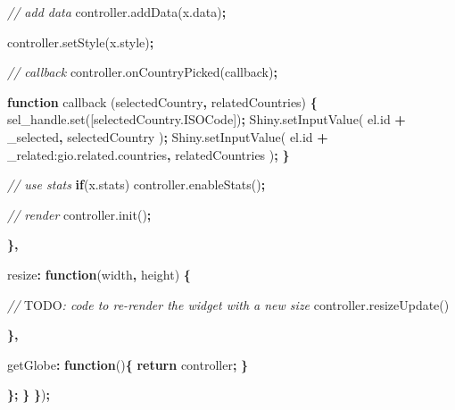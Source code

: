 \documentclass[
  10pt,
]{krantz}
\makeatletter
\newenvironment{Shaded}{\begin{snugshade}}{\end{snugshade}}
\newcommand{\AlertTok}[1]{\textcolor[rgb]{0.33,0.33,0.33}{#1}}
\newcommand{\AttributeTok}[1]{\textcolor[rgb]{0.61,0.61,0.61}{#1}}
\newcommand{\CommentTok}[1]{\textcolor[rgb]{0.37,0.37,0.37}{\textit{#1}}}
\newcommand{\ControlFlowTok}[1]{\textcolor[rgb]{0.27,0.27,0.27}{\textbf{#1}}}
\newcommand{\DataTypeTok}[1]{\textcolor[rgb]{0.27,0.27,0.27}{#1}}
\newcommand{\KeywordTok}[1]{\textcolor[rgb]{0.27,0.27,0.27}{\textbf{#1}}}
\newcommand{\NormalTok}[1]{#1}
\newcommand{\OperatorTok}[1]{\textcolor[rgb]{0.43,0.43,0.43}{\textbf{#1}}}
\newcommand{\StringTok}[1]{\textcolor[rgb]{0.5,0.5,0.5}{#1}}
\newcommand{\VariableTok}[1]{\textcolor[rgb]{0,0,0}{#1}}
\newenvironment{kframe}{%
\medskip{}
\setlength{\fboxsep}{.8em}
 \def\at@end@of@kframe{}%
 \ifinner\ifhmode%
  \def\at@end@of@kframe{\end{minipage}}%
  \begin{minipage}{\columnwidth}%
 \fi\fi%
 \def\FrameCommand##1{\hskip\@totalleftmargin \hskip-\fboxsep
 \colorbox{shadecolor}{##1}\hskip-\fboxsep
     \hskip-\linewidth \hskip-\@totalleftmargin \hskip\columnwidth}%
 \MakeFramed {\advance\hsize-\width
   \@totalleftmargin\z@ \linewidth\hsize
   \@setminipage}}%
 {\par\unskip\endMakeFramed%
 \at@end@of@kframe}
\renewenvironment{Shaded}{\begin{kframe}}{\end{kframe}}
\makeatother
\begin{document}
\begin{Shaded}
\begin{Highlighting}[]
        \CommentTok{// add data}
        \VariableTok{controller}\NormalTok{.}\AttributeTok{addData}\NormalTok{(}\VariableTok{x}\NormalTok{.}\AttributeTok{data}\NormalTok{)}\OperatorTok{;}

        \VariableTok{controller}\NormalTok{.}\AttributeTok{setStyle}\NormalTok{(}\VariableTok{x}\NormalTok{.}\AttributeTok{style}\NormalTok{)}\OperatorTok{;}

        \CommentTok{// callback}
        \VariableTok{controller}\NormalTok{.}\AttributeTok{onCountryPicked}\NormalTok{(callback)}\OperatorTok{;}

        \KeywordTok{function} \AttributeTok{callback}\NormalTok{ (selectedCountry}\OperatorTok{,}\NormalTok{ relatedCountries) }\OperatorTok{\{}
          \VariableTok{sel\_handle}\NormalTok{.}\AttributeTok{set}\NormalTok{([}\VariableTok{selectedCountry}\NormalTok{.}\AttributeTok{ISOCode}\NormalTok{])}\OperatorTok{;}
          \VariableTok{Shiny}\NormalTok{.}\AttributeTok{setInputValue}\NormalTok{(}
            \VariableTok{el}\NormalTok{.}\AttributeTok{id} \OperatorTok{+} \StringTok{\textquotesingle{}\_selected\textquotesingle{}}\OperatorTok{,} 
\NormalTok{            selectedCountry}
\NormalTok{          )}\OperatorTok{;}
          \VariableTok{Shiny}\NormalTok{.}\AttributeTok{setInputValue}\NormalTok{(}
            \VariableTok{el}\NormalTok{.}\AttributeTok{id} \OperatorTok{+} \StringTok{\textquotesingle{}\_related:gio.related.countries\textquotesingle{}}\OperatorTok{,} 
\NormalTok{            relatedCountries}
\NormalTok{          )}\OperatorTok{;}
        \OperatorTok{\}}

        \CommentTok{// use stats}
        \ControlFlowTok{if}\NormalTok{(}\VariableTok{x}\NormalTok{.}\AttributeTok{stats}\NormalTok{)}
          \VariableTok{controller}\NormalTok{.}\AttributeTok{enableStats}\NormalTok{()}\OperatorTok{;}

        \CommentTok{// render}
        \VariableTok{controller}\NormalTok{.}\AttributeTok{init}\NormalTok{()}\OperatorTok{;}

      \OperatorTok{\},}

      \DataTypeTok{resize}\OperatorTok{:} \KeywordTok{function}\NormalTok{(width}\OperatorTok{,}\NormalTok{ height) }\OperatorTok{\{}

        \CommentTok{// }\AlertTok{TODO}\CommentTok{: code to re{-}render the widget with a new size}
        \VariableTok{controller}\NormalTok{.}\AttributeTok{resizeUpdate}\NormalTok{()}

      \OperatorTok{\},}

      \DataTypeTok{getGlobe}\OperatorTok{:} \KeywordTok{function}\NormalTok{()}\OperatorTok{\{}
        \ControlFlowTok{return}\NormalTok{ controller}\OperatorTok{;}
      \OperatorTok{\}}

    \OperatorTok{\};}
  \OperatorTok{\}}
\OperatorTok{\}}\NormalTok{)}\OperatorTok{;}
\end{Highlighting}
\end{Shaded}
\end{document}
